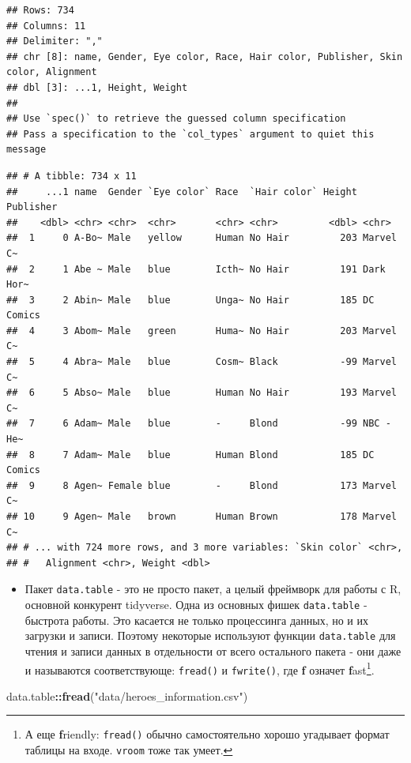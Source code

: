 \documentclass[
]{book}
\newenvironment{Shaded}{\begin{snugshade}}{\end{snugshade}}
\newcommand{\KeywordTok}[1]{\textcolor[rgb]{0.13,0.29,0.53}{\textbf{#1}}}
\newcommand{\NormalTok}[1]{#1}
\newcommand{\OperatorTok}[1]{\textcolor[rgb]{0.81,0.36,0.00}{\textbf{#1}}}
\newcommand{\StringTok}[1]{\textcolor[rgb]{0.31,0.60,0.02}{#1}}
\providecommand{\tightlist}{%
  \setlength{\itemsep}{0pt}\setlength{\parskip}{0pt}}
\begin{document}
\begin{verbatim}
## Rows: 734
## Columns: 11
## Delimiter: ","
## chr [8]: name, Gender, Eye color, Race, Hair color, Publisher, Skin color, Alignment
## dbl [3]: ...1, Height, Weight
## 
## Use `spec()` to retrieve the guessed column specification
## Pass a specification to the `col_types` argument to quiet this message
\end{verbatim}

\begin{verbatim}
## # A tibble: 734 x 11
##     ...1 name  Gender `Eye color` Race  `Hair color` Height Publisher
##    <dbl> <chr> <chr>  <chr>       <chr> <chr>         <dbl> <chr>    
##  1     0 A-Bo~ Male   yellow      Human No Hair         203 Marvel C~
##  2     1 Abe ~ Male   blue        Icth~ No Hair         191 Dark Hor~
##  3     2 Abin~ Male   blue        Unga~ No Hair         185 DC Comics
##  4     3 Abom~ Male   green       Huma~ No Hair         203 Marvel C~
##  5     4 Abra~ Male   blue        Cosm~ Black           -99 Marvel C~
##  6     5 Abso~ Male   blue        Human No Hair         193 Marvel C~
##  7     6 Adam~ Male   blue        -     Blond           -99 NBC - He~
##  8     7 Adam~ Male   blue        Human Blond           185 DC Comics
##  9     8 Agen~ Female blue        -     Blond           173 Marvel C~
## 10     9 Agen~ Male   brown       Human Brown           178 Marvel C~
## # ... with 724 more rows, and 3 more variables: `Skin color` <chr>,
## #   Alignment <chr>, Weight <dbl>
\end{verbatim}

\begin{itemize}
\tightlist
\item
  Пакет \texttt{data.table} - это не просто пакет, а целый фреймворк для работы с R, основной конкурент tidyverse. Одна из основных фишек \texttt{data.table} - быстрота работы. Это касается не только процессинга данных, но и их загрузки и записи. Поэтому некоторые используют функции \texttt{data.table} для чтения и записи данных в отдельности от всего остального пакета - они даже и называются соответствующе: \texttt{fread()} и \texttt{fwrite()}, где \textbf{f} означет \textbf{f}ast\footnote{А еще \textbf{f}riendly: \texttt{fread()} обычно самостоятельно хорошо угадывает формат таблицы на входе. \texttt{vroom} тоже так умеет.}.
\end{itemize}

\begin{Shaded}
\begin{Highlighting}[]
\NormalTok{data.table}\OperatorTok{::}\KeywordTok{fread}\NormalTok{(}\StringTok{"data/heroes_information.csv"}\NormalTok{)}
\end{Highlighting}
\end{Shaded}
\end{document}
